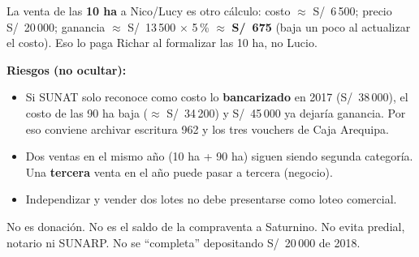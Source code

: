 \documentclass[12pt,a4paper]{article}
\begin{document}
\vspace{0.25em}
\noindent La venta de las \textbf{10 ha} a Nico/Lucy es otro cálculo: costo $\approx$ S/\ 6\,500; precio S/\ 20\,000; ganancia $\approx$ S/\ 13\,500 $\times$ 5\,\% $\approx$ \textbf{S/\ 675} (baja un poco al actualizar el costo). Eso lo paga Richar al formalizar las 10 ha, no Lucio.

\textbf{Riesgos (no ocultar):}
\begin{itemize}[leftmargin=1.1cm,itemsep=0.12em]
\item Si SUNAT solo reconoce como costo lo \textbf{bancarizado} en 2017 (S/\ 38\,000), el costo de las 90 ha baja ($\approx$ S/\ 34\,200) y S/\ 45\,000 ya dejaría ganancia. Por eso conviene archivar escritura 962 y los tres vouchers de Caja Arequipa.
\item Dos ventas en el mismo año (10 ha + 90 ha) siguen siendo segunda categoría. Una \textbf{tercera} venta en el año puede pasar a tercera (negocio).
\item Independizar y vender dos lotes no debe presentarse como loteo comercial.
\end{itemize}

No es donación. No es el saldo de la compraventa a Saturnino. No evita predial, notario ni SUNARP. No se ``completa'' depositando S/\ 20\,000 de 2018.

\LugarFecha
{}
\end{document}
